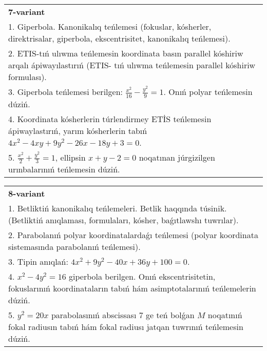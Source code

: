\documentclass{article}
\begin{document}
\begin{tabular}{m{17cm}}
\textbf{7-variant}\\
1. Giperbola. Kanonikalıq teńlemesi (fokuslar, kósherler, direktrisalar, giperbola, ekscentrisitet, kanonikalıq teńlemesi).\\

2. ETIS-tıń ulıwma teńlemesin koordinata basın parallel kóshiriw arqalı ápiwayılastırıń (ETIS- tıń ulıwma teńlemesin parallel kóshiriw formulası).\\

3. Giperbola teńlemesi berilgen: $\frac{x^{2}}{16}-\frac{y^{2}}{9}=1$. Onıń polyar teńlemesin dúziń.\\

4. Koordinata kósherlerin túrlendirmey ETİS teńlemesin ápiwaylastırıń, yarım kósherlerin tabıń $4x^{2} - 4xy + 9y^{2} - 26x - 18y + 3 = 0$.\\

5. $\frac{x^{2}}{2} + \frac{y^{2}}{3} = 1$, ellipsin $x + y - 2 = 0$ noqatınan júrgizilgen urınbalarınıń teńlemesin dúziń.  
\end{tabular}
\vspace{1cm}


\begin{tabular}{m{17cm}}
\textbf{8-variant}\\
1. Betliktiń kanonikalıq teńlemeleri. Betlik haqqında túsinik. (Betliktiń anıqlaması, formulaları, kósher, baǵıtlawshı tuwrılar).\\

2. Parabolanıń polyar koordinatalardaǵı teńlemesi (polyar koordinata sistemasında parabolanıń teńlemesi).\\

3. Tipin anıqlań: $4 x^2+9 y^2-40 x+36 y+100=0$.\\

4. $x^{2} - 4y^{2} = 16$ giperbola berilgen. Onıń ekscentrisitetin, fokuslarınıń koordinataların tabıń hám asimptotalarınıń teńlemelerin dúziń.\\

5. $y^{2} = 20x$ parabolasınıń abscissası 7 ge teń bolǵan $M$ noqatınıń fokal radiusın tabıń hám fokal radiusı jatqan tuwrınıń teńlemesin dúziń.  
\end{tabular}
\vspace{1cm}
\end{document}

